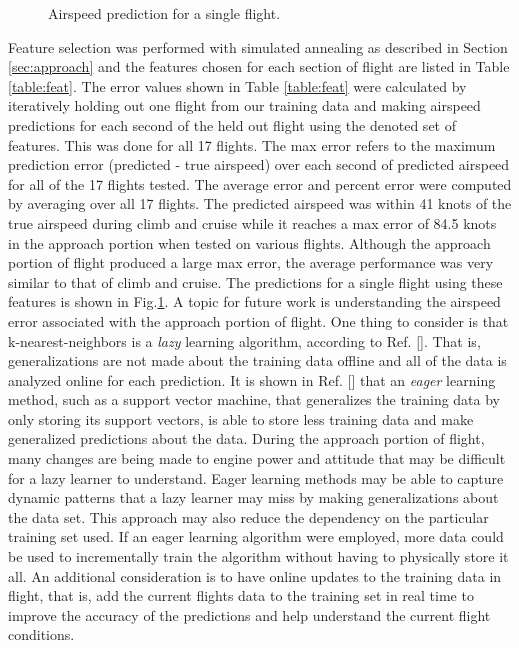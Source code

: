 \documentclass[]{aiaa-tc}
\begin{document}
\begin{figure}[h!]

\caption{\label{fig:Airspeed predictions}Airspeed prediction for a single flight.}
\end{figure}

Feature selection was performed with simulated annealing as described in Section \ref{sec:approach} and the features chosen for each section of flight are listed in Table \ref{table:feat}. The error values shown in Table \ref{table:feat} were calculated by iteratively holding out one flight from our training data and making airspeed predictions for each second of the held out flight using the denoted set of features. This was done for all 17 flights. The max error refers to the maximum prediction error (predicted - true airspeed) over each second of predicted airspeed for all of the 17 flights tested. The average error and percent error were computed by averaging over all 17 flights. The predicted airspeed was within 41 knots of the true airspeed during climb and cruise while it reaches a max error of 84.5 knots in the approach portion when tested on various flights. Although the approach portion of flight produced a large max error, the average performance was very similar to that of climb and cruise. The predictions for a single flight using these features is shown in Fig.\ref{fig:Airspeed predictions}.  A topic for future work is understanding the airspeed error associated with the approach portion of flight. One thing to consider is that k-nearest-neighbors is a {\em lazy} learning algorithm, according to Ref. []. That is, generalizations are not made about the training data offline and all of the data is analyzed online for each prediction. It is shown in Ref. [] that an {\em eager} learning method, such as a support vector machine, that generalizes the training data by only storing its support vectors, is able to store less training data and make generalized predictions about the data. During the approach portion of flight, many changes are being made to engine power and attitude that may be difficult for a lazy learner to understand. Eager learning methods may be able to capture dynamic patterns that a lazy learner may miss by making generalizations about the data set. This approach may also reduce the dependency on the particular training set used. If an eager learning algorithm were employed, more data could be used to incrementally train the algorithm without having to physically store it all. An additional consideration is to have online updates to the training data in flight, that is, add the current flights data to the training set in real time to improve the accuracy of the predictions and help understand the current flight conditions. 
\end{document}
